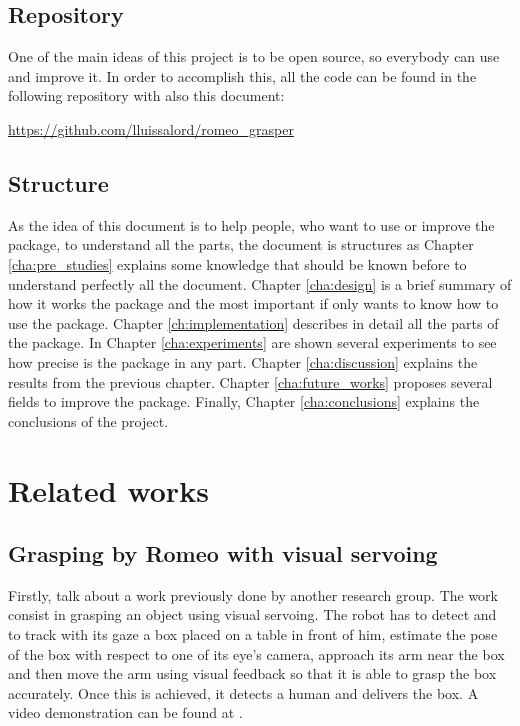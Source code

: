 \documentclass[12pt,a4paper,final,twoside,openright]{report}
\begin{document}
\section{Repository}

One of the main ideas of this project is to be open source, so everybody can use and improve it. In order to accomplish this, all the code can be found in the following repository with also this document:

\url{https://github.com/lluissalord/romeo_grasper}

\section{Structure}

As the idea of this document is to help people, who want to use or improve the package, to understand all the parts, the document is structures as Chapter \ref{cha:pre_studies} explains some knowledge that should be known before to understand perfectly all the document. Chapter \ref{cha:design} is a brief summary of how it works the package and the most important if only wants to know how to use the package. Chapter \ref{ch:implementation} describes in detail all the parts of the package. In Chapter \ref{cha:experiments} are shown several experiments to see how precise is the package in any part. Chapter \ref{cha:discussion} explains the results from the previous chapter. Chapter \ref{cha:future_works} proposes several fields to improve the package. Finally, Chapter \ref{cha:conclusions} explains the conclusions of the project.

\chapter{Related works}


\section{Grasping by Romeo with visual servoing}
\label{sec:grasping_romeo_visual_servoing}

Firstly, talk about a work previously done by another research group. The work \cite{claudio:hal-01159882} consist in grasping an object using visual servoing. The robot has to detect and to track with its gaze a box placed on a table in front of him, estimate the pose of the box with respect to one of its eye's camera, approach its arm near the box and then move the arm using visual feedback so that it is able to grasp the box accurately. Once this is achieved, it detects a human and delivers the box. A video demonstration can be found at \cite{InriaLagadicgroup}.
\end{document}
